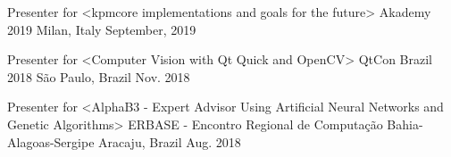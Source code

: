 

\begin{cventries}


  \cventry
    {Presenter for <kpmcore implementations and goals for the future>}
    {Akademy 2019}
    {Milan, Italy}
    {September, 2019}
    {
    }

  \cventry
    {Presenter for <Computer Vision with Qt Quick and OpenCV>} %
    {QtCon Brazil 2018} %
    {São Paulo, Brazil} %
    {Nov. 2018} %
    {
    }


  \cventry
    {Presenter for <AlphaB3 - Expert Advisor Using Artificial Neural Networks and Genetic Algorithms>} %
    {ERBASE - Encontro Regional de Computação Bahia-Alagoas-Sergipe} %
    {Aracaju, Brazil} %
    {Aug. 2018} %
    {
    }



\end{cventries}
